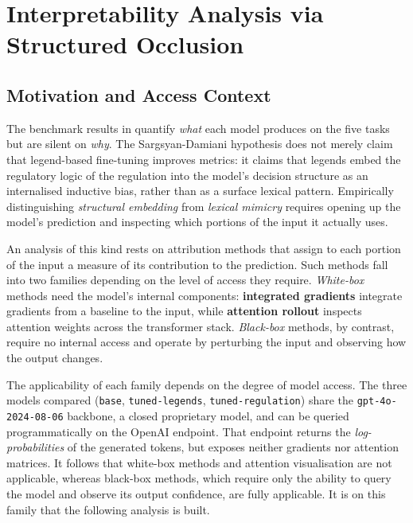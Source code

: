 \documentclass[pdflatex, sn-apa]{sn-jnl}%
\theoremstyle{thmstyleone}%
\theoremstyle{thmstyletwo}%
\theoremstyle{thmstylethree}%
\newcommand{\modelbase}{\texttt{base}}
\newcommand{\modellegends}{\texttt{tuned-legends}}
\newcommand{\modelreg}{\texttt{tuned-regulation}}
\begin{document}
\FloatBarrier
\section{Interpretability Analysis via Structured Occlusion}
\label{sec:xai}

\subsection{Motivation and Access Context}
\label{sec:xai:motivation}

The benchmark results in  quantify \emph{what} each model
produces on the five tasks but are silent on \emph{why}. The Sargsyan-Damiani
hypothesis does not merely claim that legend-based fine-tuning improves metrics:
it claims that legends embed the regulatory logic of the regulation into the
model's decision structure as an internalised inductive bias, rather than as a
surface lexical pattern. Empirically distinguishing \emph{structural embedding}
from \emph{lexical mimicry} requires opening up the model's prediction and
inspecting which portions of the input it actually uses.

An analysis of this kind rests on attribution methods that assign to each portion
of the input a measure of its contribution to the prediction. Such methods fall
into two families depending on the level of access they require. \emph{White-box}
methods need the model's internal components: \textbf{integrated gradients}
integrate gradients from a baseline to the input, while \textbf{attention
rollout} inspects attention weights across the transformer stack.
\emph{Black-box} methods, by contrast, require no internal access and operate by
perturbing the input and observing how the output changes.

The applicability of each family depends on the degree of model access. The three
models compared (\modelbase{}, \modellegends{}, \modelreg{}) share the
\texttt{gpt-4o-2024-08-06} backbone, a closed proprietary model, and can be
queried programmatically on the OpenAI endpoint. That endpoint returns the
\emph{log-probabilities} of the generated tokens, but exposes neither gradients
nor attention matrices. It follows that white-box methods and attention
visualisation are not applicable, whereas black-box methods, which require only
the ability to query the model and observe its output confidence, are fully
applicable. It is on this family that the following analysis is built.
\end{document}
